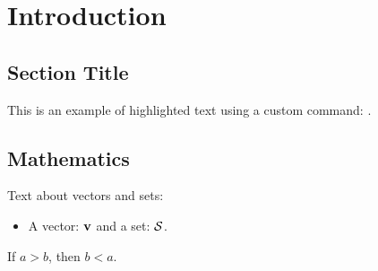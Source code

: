 \chapter{Introduction}
\section{Section Title}
This is an example of highlighted text using a custom command: .

\section{Mathematics}
Text about vectors and sets:
\begin{itemize}
    \item A vector: $\mathbf{v}$ and a set: $\mathcal{S}$.
\end{itemize}

\begin{theorem}
If \( a > b \), then \( b < a \).
\end{theorem}

